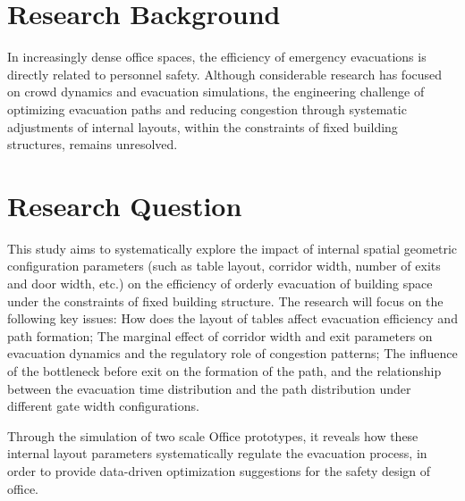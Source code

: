 \section{Research Background}
In increasingly dense office spaces, the efficiency of emergency evacuations is directly related to personnel safety. Although considerable research has focused on crowd dynamics and evacuation simulations, the engineering challenge of optimizing evacuation paths and reducing congestion through systematic adjustments of internal layouts, within the constraints of fixed building structures, remains unresolved. 

\section{Research Question}
This study aims to systematically explore the impact of internal spatial geometric configuration parameters (such as table layout, corridor width, number of exits and door width, etc.) on the efficiency of orderly evacuation of building space under the constraints of fixed building structure. The research will focus on the following key issues: How does the layout of tables affect evacuation efficiency and path formation; The marginal effect of corridor width and exit parameters on evacuation dynamics and the regulatory role of congestion patterns; The influence of the bottleneck before exit on the formation of the path, and the relationship between the evacuation time distribution and the path distribution under different gate width configurations. 

Through the simulation of two scale Office prototypes, it reveals how these internal layout parameters systematically regulate the evacuation process, in order to provide data-driven optimization suggestions for the safety design of office.

